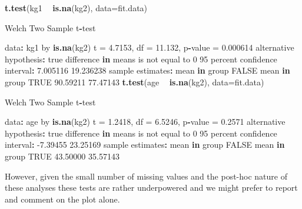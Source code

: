 \documentclass[]{article}
\newenvironment{Shaded}{\begin{snugshade}}{\end{snugshade}}
\newcommand{\ControlFlowTok}[1]{\textcolor[rgb]{0.13,0.29,0.53}{\textbf{#1}}}
\newcommand{\DataTypeTok}[1]{\textcolor[rgb]{0.13,0.29,0.53}{#1}}
\newcommand{\DecValTok}[1]{\textcolor[rgb]{0.00,0.00,0.81}{#1}}
\newcommand{\FloatTok}[1]{\textcolor[rgb]{0.00,0.00,0.81}{#1}}
\newcommand{\KeywordTok}[1]{\textcolor[rgb]{0.13,0.29,0.53}{\textbf{#1}}}
\newcommand{\NormalTok}[1]{#1}
\newcommand{\OperatorTok}[1]{\textcolor[rgb]{0.81,0.36,0.00}{\textbf{#1}}}
\newcommand{\OtherTok}[1]{\textcolor[rgb]{0.56,0.35,0.01}{#1}}
\newcommand{\StringTok}[1]{\textcolor[rgb]{0.31,0.60,0.02}{#1}}
\begin{document}
\begin{Shaded}
\begin{Highlighting}[]
\KeywordTok{t.test}\NormalTok{(kg1 }\OperatorTok{~}\StringTok{ }\KeywordTok{is.na}\NormalTok{(kg2), }\DataTypeTok{data=}\NormalTok{fit.data)}

\NormalTok{    Welch Two Sample t}\OperatorTok{-}\NormalTok{test}

\NormalTok{data}\OperatorTok{:}\StringTok{  }\NormalTok{kg1 by }\KeywordTok{is.na}\NormalTok{(kg2)}
\NormalTok{t =}\StringTok{ }\FloatTok{4.7153}\NormalTok{, df =}\StringTok{ }\FloatTok{11.132}\NormalTok{, p}\OperatorTok{-}\NormalTok{value =}\StringTok{ }\FloatTok{0.000614}
\NormalTok{alternative hypothesis}\OperatorTok{:}\StringTok{ }\NormalTok{true difference }\ControlFlowTok{in}\NormalTok{ means is not equal to }\DecValTok{0}
\DecValTok{95}\NormalTok{ percent confidence interval}\OperatorTok{:}
\StringTok{  }\FloatTok{7.005116} \FloatTok{19.236238}
\NormalTok{sample estimates}\OperatorTok{:}
\NormalTok{mean }\ControlFlowTok{in}\NormalTok{ group }\OtherTok{FALSE}\NormalTok{  mean }\ControlFlowTok{in}\NormalTok{ group }\OtherTok{TRUE} 
           \FloatTok{90.59211}            \FloatTok{77.47143} 
\KeywordTok{t.test}\NormalTok{(age }\OperatorTok{~}\StringTok{ }\KeywordTok{is.na}\NormalTok{(kg2), }\DataTypeTok{data=}\NormalTok{fit.data)}

\NormalTok{    Welch Two Sample t}\OperatorTok{-}\NormalTok{test}

\NormalTok{data}\OperatorTok{:}\StringTok{  }\NormalTok{age by }\KeywordTok{is.na}\NormalTok{(kg2)}
\NormalTok{t =}\StringTok{ }\FloatTok{1.2418}\NormalTok{, df =}\StringTok{ }\FloatTok{6.5246}\NormalTok{, p}\OperatorTok{-}\NormalTok{value =}\StringTok{ }\FloatTok{0.2571}
\NormalTok{alternative hypothesis}\OperatorTok{:}\StringTok{ }\NormalTok{true difference }\ControlFlowTok{in}\NormalTok{ means is not equal to }\DecValTok{0}
\DecValTok{95}\NormalTok{ percent confidence interval}\OperatorTok{:}
\StringTok{ }\FloatTok{-7.39455} \FloatTok{23.25169}
\NormalTok{sample estimates}\OperatorTok{:}
\NormalTok{mean }\ControlFlowTok{in}\NormalTok{ group }\OtherTok{FALSE}\NormalTok{  mean }\ControlFlowTok{in}\NormalTok{ group }\OtherTok{TRUE} 
           \FloatTok{43.50000}            \FloatTok{35.57143} 
\end{Highlighting}
\end{Shaded}

However, given the small number of missing values and the post-hoc nature of these analyses these tests are rather underpowered and we might prefer to report and comment on the plot alone.
\end{document}
